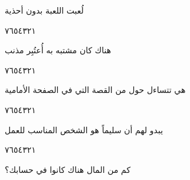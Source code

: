 \documentclass[11pt, a4paper]{article}
\begin{document}
{\vfill\clearpage

\vspace{0.5\baselineskip}\begin{flushright}
\textarabic{لُعبت اللعبة بدون أحذية}
\end{flushright}

\begin{center}
        \hfill\textarabic{٧}\hfill\textarabic{٦}\hfill\textarabic{٥}\hfill\textarabic{٤}\hfill\textarabic{٣}\hfill\textarabic{٢}\hfill\textarabic{١}
        \end{center}


\vspace{0.5\baselineskip}\begin{flushright}
\textarabic{هناك كان مشتبه به أُعتُبِر مذنب}
\end{flushright}

\begin{center}
        \hfill\textarabic{٧}\hfill\textarabic{٦}\hfill\textarabic{٥}\hfill\textarabic{٤}\hfill\textarabic{٣}\hfill\textarabic{٢}\hfill\textarabic{١}
        \end{center}


\vspace{0.5\baselineskip}\begin{flushright}
\textarabic{هي تتساءل حول من القصة التي في الصفحة الأمامية}
\end{flushright}

\begin{center}
        \hfill\textarabic{٧}\hfill\textarabic{٦}\hfill\textarabic{٥}\hfill\textarabic{٤}\hfill\textarabic{٣}\hfill\textarabic{٢}\hfill\textarabic{١}
        \end{center}


\vspace{0.5\baselineskip}\begin{flushright}
\textarabic{يبدو لهم أن سليماً هو الشخص المناسب للعمل}
\end{flushright}

\begin{center}
        \hfill\textarabic{٧}\hfill\textarabic{٦}\hfill\textarabic{٥}\hfill\textarabic{٤}\hfill\textarabic{٣}\hfill\textarabic{٢}\hfill\textarabic{١}
        \end{center}


\vspace{0.5\baselineskip}\begin{flushright}
\textarabic{كم من المال هناك كانوا في حسابك؟}
\end{flushright}

}
\end{document}
